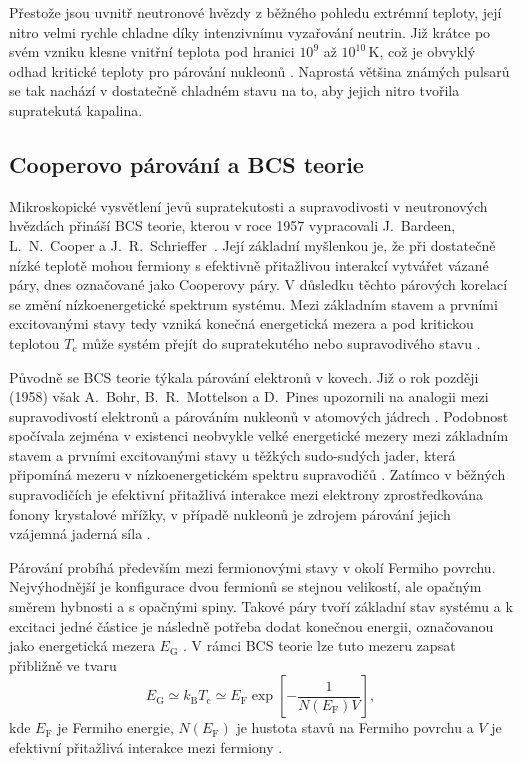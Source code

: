 \documentclass[%
final%
,htext%
]{ipothes}
\begin{document}
Přestože jsou uvnitř neutronové hvězdy z běžného pohledu extrémní teploty, její nitro velmi rychle chladne díky intenzivnímu vyzařování neutrin. Již krátce po svém vzniku klesne vnitřní teplota pod hranici $10^9$ až $10^{10}\,\mathrm{K}$, což je obvyklý odhad kritické teploty pro párování nukleonů \cite{andersson2021}. Naprostá většina známých pulsarů se tak nachází v dostatečně chladném stavu na to, aby jejich nitro tvořila supratekutá kapalina.



\subsection{Cooperovo párování a BCS teorie}

Mikroskopické vysvětlení jevů supratekutosti a supravodivosti v neutronových hvězdách přináší BCS teorie, kterou v roce 1957 vypracovali \mbox{J.~Bardeen}, \mbox{L.~N.~Cooper} a \mbox{J.~R.~Schrieffer}~\cite{bardeen1957}. Její základní myšlenkou je, že při dostatečně nízké teplotě mohou fermiony s efektivně přitažlivou interakcí vytvářet vázané páry, dnes označované jako Cooperovy páry. V důsledku těchto párových korelací se změní nízkoenergetické spektrum systému. Mezi základním stavem a prvními excitovanými stavy tedy vzniká konečná energetická mezera a pod kritickou teplotou $T_\mathrm{c}$ může systém přejít do supratekutého nebo supravodivého stavu \cite{ghosh2007}.

Původně se BCS teorie týkala párování elektronů v kovech. Již o rok později (1958) však A.~Bohr, B.~R.~Mottelson a D.~Pines upozornili na analogii mezi supravodivostí elektronů a párováním nukleonů v atomových jádrech \cite{bohr1958}. Podobnost spočívala zejména v existenci neobvykle velké energetické mezery mezi základním stavem a prvními excitovanými stavy u těžkých sudo-sudých jader, která připomíná mezeru v nízkoenergetickém spektru supravodičů \cite{bohr1958}. Zatímco v běžných supravodičích je efektivní přitažlivá interakce mezi elektrony zprostředkována fonony krystalové mřížky, v případě nukleonů je zdrojem párování jejich vzájemná jaderná síla \cite{ghosh2007}.

Párování probíhá především mezi fermionovými stavy v okolí Fermiho povrchu. Nejvýhodnější je konfigurace dvou fermionů se stejnou velikostí, ale opačným směrem hybnosti a s opačnými spiny. Takové páry tvoří základní stav systému a k excitaci jedné částice je následně potřeba dodat konečnou energii, označovanou jako energetická mezera $E_\mathrm{G}$ \cite{ghosh2007}. V rámci BCS teorie lze tuto mezeru zapsat přibližně ve tvaru
\begin{equation}
    E_\mathrm{G}
    \simeq
    k_\mathrm{B}T_\mathrm{c}
    \simeq
    E_\mathrm{F}
    \exp\left[-\frac{1}{N(E_\mathrm{F})V}\right],
    \label{eq:bcs_gap}
\end{equation}
kde $E_\mathrm{F}$ je Fermiho energie, $N(E_\mathrm{F})$ je hustota stavů na Fermiho povrchu a $V$ je efektivní přitažlivá interakce mezi fermiony \cite{ghosh2007}.
\end{document}
